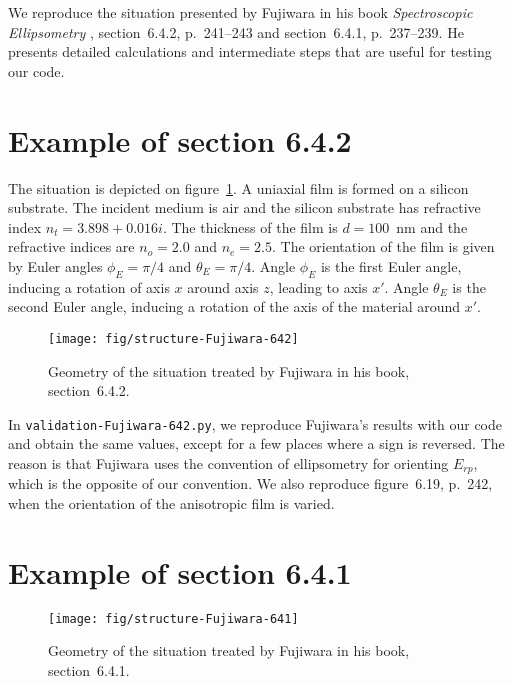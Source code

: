 

We reproduce the situation presented by Fujiwara in his book \emph{Spectroscopic Ellipsometry} \cite{Fujiwara}, section~6.4.2, p.~241--243 and section~6.4.1, p.~237--239.
He presents detailed calculations and intermediate steps that are useful for testing our code.


\section{Example of section 6.4.2}

The situation is depicted on figure~\ref{fig:situation642}.
A uniaxial film is formed on a silicon substrate.
The incident medium is air and the silicon substrate has refractive index $n_t = 3.898 + 0.016i$.
The thickness of the film is $d = 100$~nm and the refractive indices are $n_o = 2.0$ and $n_e=2.5$. 
The orientation of the film is given by Euler angles $\phi_E=\pi/4$ and $\theta_E = \pi/4$.
Angle $\phi_E$ is the first Euler angle, inducing a rotation of axis $x$ around axis $z$, leading to axis $x'$.
Angle $\theta_E$ is the second Euler angle, inducing a rotation of the axis of the material around $x'$.

\begin{figure}[b]
\texttt{[image: fig/structure-Fujiwara-642]}
\caption{\label{fig:situation642}Geometry of the situation treated by Fujiwara in his book, section~6.4.2.}
\end{figure}

In \verb/validation-Fujiwara-642.py/, we reproduce Fujiwara's results with our code and obtain the same values, except for a few places where a sign is reversed.
The reason is that Fujiwara uses the convention of ellipsometry for orienting $E_{rp}$, which is the opposite of our convention.
We also reproduce figure~6.19, p.~242, when the orientation of the anisotropic film is varied.

\vspace{10cm}
\mbox{}
\vspace{7cm}

\section{Example of section 6.4.1}

\begin{figure}[b]
\texttt{[image: fig/structure-Fujiwara-641]}
\caption{\label{fig:situation641}Geometry of the situation treated by Fujiwara in his book, section~6.4.1.}
\end{figure}

